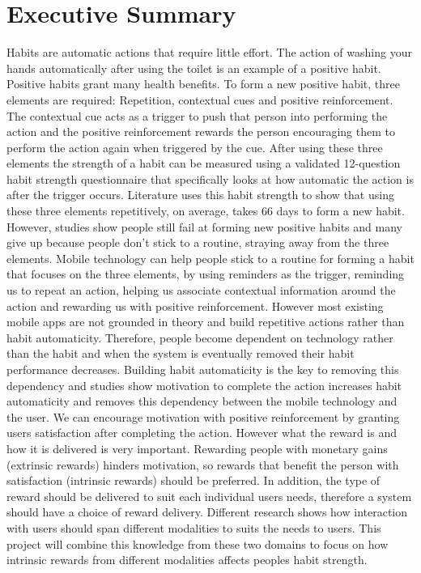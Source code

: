 \section*{Executive Summary}

Habits are automatic actions that require little effort. The action of washing your hands automatically after using the toilet is an example of a positive habit. Positive habits grant many health benefits. To form a new positive habit, three elements are required: Repetition, contextual cues and positive reinforcement. The contextual cue acts as a trigger to push that person into performing the action and the positive reinforcement rewards the person encouraging them to perform the action again when triggered by the cue. After using these three elements the strength of a habit can be measured using a validated 12-question habit strength questionnaire that specifically looks at how automatic the action is after the trigger occurs. Literature uses this habit strength to show that using these three elements repetitively, on average, takes 66 days to form a new habit. However, studies show people still fail at forming new positive habits and many give up because people don't stick to a routine, straying away from the three elements.\newline
\newline
Mobile technology can help people stick to a routine for forming a habit that focuses on the three elements, by using reminders as the trigger, reminding us to repeat an action, helping us associate contextual information around the action and rewarding us with positive reinforcement. However most existing mobile apps are not grounded in theory and build repetitive actions rather than habit automaticity. Therefore, people become dependent on technology rather than the habit and when the system is eventually removed their habit performance decreases.\newline
\newline
Building habit automaticity is the key to removing this dependency and studies show motivation to complete the action increases habit automaticity and removes this dependency between the mobile technology and the user. We can encourage motivation with positive reinforcement by granting users satisfaction after completing the action. However what the reward is and how it is delivered is very important. Rewarding people with monetary gains (extrinsic rewards) hinders motivation, so rewards that benefit the person with satisfaction (intrinsic rewards) should be preferred. In addition, the type of reward should be delivered to suit each individual users needs, therefore a system should have a choice of reward delivery. Different research shows how interaction with users should span different modalities to suits the needs to users. This project will combine this knowledge from these two domains to focus on how intrinsic rewards from different modalities affects peoples habit strength.\newline
